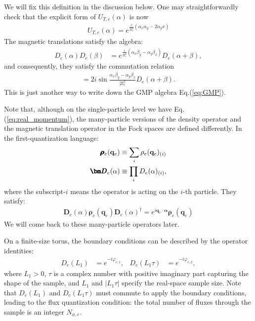 We will fix this definition in the discussion below. One may straightforwardly check that the explicit form of $U_{T,e}(\alpha)$ is now
\begin{align}
U_{T,e}(\alpha)=e^{\frac{i}{2l_e^2}(\alpha_x \alpha_y-2\alpha_y x)}\label{eq:U_T}
\end{align}
The magnetic translations satisfy the algebra:
\begin{align}
D_e(\alpha)D_e(\beta)&=e^{\frac{i}{2l_e^2}(\alpha_x \beta_y-\alpha_y \beta_x)}D_e(\alpha+\beta),
\end{align}
and consequently, they satisfy the commutation relation
\begin{align}
[D_e(\alpha),D_e(\beta)]=2i\sin\frac{\alpha_x \beta_y-\alpha_y \beta_x}{2l_e^2} D_e(\alpha+\beta).
\end{align}
This is just another way to write down the GMP algebra Eq.(\ref{eq:GMP}).

Note that, although on the single-particle level we have Eq.(\ref{eq:real_momentum}),  the many-particle versions of the density operator and the magnetic translation operator in the Fock spaces are defined differently. In the first-quantization language:
\begin{align}
\pmb{\boldsymbol\rho}_e(\mathbf q_e)&\equiv \sum_i \rho_e(\mathbf q_e)_{(i)}\notag\\
\pmb{\bm D}_e(\alpha)&\equiv \prod_i D_e(\alpha)_{(i)},
\end{align}
where the subscript-$i$ means the operator is acting on the $i$-th particle. They satisfy:
\begin{align}
\pmb{\bm D}_e(\alpha)\pmb{\boldsymbol\rho}_e(\mathbf q_e)\pmb{\bm D}_e(\alpha)^\dagger=e^{i\mathbf q_e\cdot \bm \alpha}\pmb{\boldsymbol\rho}_e(\mathbf q_e)\label{eq:D_e_rho_e}
\end{align}
We will come back to these many-particle operators later.

On a finite-size torus, the boundary conditions can be described by the operator identities:
\begin{align}
D_e(L_1)&=e^{-i\varphi_{e,1}},& D_e(L_1\tau)&=e^{-i\varphi_{e,2}},\label{eq:boundary_conditions}
\end{align}
where $L_1>0$, $\tau$ is a complex number with positive imaginary part capturing the shape of the sample, and $L_1$ and $|L_1\tau|$ specify the real-space sample size. Note that $D_e(L_1)$ and $D_e(L_1\tau)$ must commute to apply the boundary conditions, leading to the flux quantization condition: the total number of fluxes through the sample is an integer $N_{\phi,e}$.


